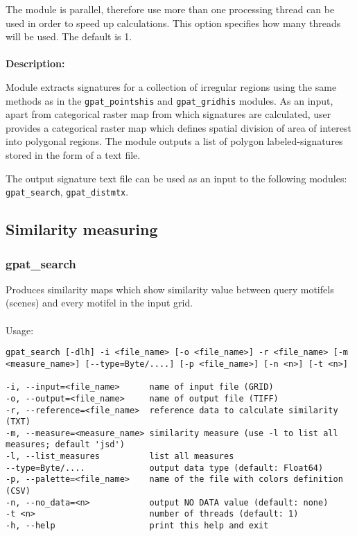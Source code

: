 
The module is parallel, therefore use more than one processing thread can be used in order to speed up calculations. 
This option specifies how many threads will be used. 
The default is 1.
\\\\
{\bf Description:}

Module extracts signatures for a collection of irregular regions using the same methods as in the {\tt gpat\_pointshis} and {\tt gpat\_gridhis} modules. 
As an input, apart from categorical raster map from which signatures are calculated, user provides a categorical raster map which defines spatial division of area of interest into polygonal regions. 
The module outputs a list of polygon labeled-signatures stored in the form of a text file. 

The output signature text file can be used as an input to the following modules: {\tt gpat\_search}, {\tt gpat\_distmtx}.

\subsection{Similarity measuring}

\subsubsection{gpat\_search}
Produces similarity maps which show similarity value between query motifels (scenes) and every motifel in the input grid.
\\\\
Usage:

\begin{minipage}{\linewidth}
\begin{lstlisting}
gpat_search [-dlh] -i <file_name> [-o <file_name>] -r <file_name> [-m <measure_name>] [--type=Byte/....] [-p <file_name>] [-n <n>] [-t <n>]

-i, --input=<file_name>      name of input file (GRID)
-o, --output=<file_name>     name of output file (TIFF)
-r, --reference=<file_name>  reference data to calculate similarity (TXT)
-m, --measure=<measure_name> similarity measure (use -l to list all measures; default 'jsd')
-l, --list_measures          list all measures
--type=Byte/....             output data type (default: Float64)
-p, --palette=<file_name>    name of the file with colors definition (CSV)
-n, --no_data=<n>            output NO DATA value (default: none)
-t <n>                       number of threads (default: 1)
-h, --help                   print this help and exit
\end{lstlisting}
\end{minipage}

